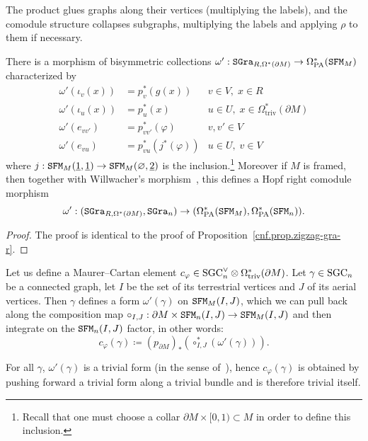 The product glues graphs along their vertices (multiplying the labels), and the comodule structure collapses subgraphs, multiplying the labels and applying $\rho$ to them if necessary.

\begin{proposition}
  \label{cnfbnd.prop.omega-prime-colored}
  There is a morphism of bisymmetric collections $\omega' : \mathtt{SGra}_{R, \Omega^{*}(\partial M)} \to \Omega_{\mathrm{PA}}^{*}(\mathtt{SFM}_{M})$ characterized by
  \begin{align*}
    \omega'(\iota_{v}(x))
    & = p_{v}^{*}(g(x))
    & v \in V, \; x \in R \\
    \omega'(\iota_{u}(x))
    & = p_{u}^{*}(x)
    & u \in U, \; x \in \Omega_{\mathrm{triv}}^{*}(\partial M) \\
    \omega'(e_{vv'})
    & = p_{vv'}^{*}(\varphi)
    & v, v' \in V \\
    \omega'(e_{vu})
    & = p_{vu}^{*}(j^{*}(\varphi))
    & u \in U, \; v \in V
  \end{align*}
  where $j : \mathtt{SFM}_{M}(\underline{1}, \underline{1}) \to \mathtt{SFM}_{M}(\varnothing,\underline{2})$ is the inclusion.\footnote{Recall that one must choose a collar $\partial M \times [0,1) \subset M$ in order to define this inclusion.}
  Moreover if $M$ is framed, then together with Willwacher's morphism~\cite{Willwacher2015a}, this defines a Hopf right comodule morphism
  \[ \omega' : (\mathtt{SGra}_{R, \Omega^{*}(\partial M)}, \mathtt{SGra}_{n}) \to (\Omega_{\mathrm{PA}}^{*}(\mathtt{SFM}_{M}), \Omega_{\mathrm{PA}}^{*}(\mathtt{SFM}_{n})). \]
\end{proposition}
\begin{proof}
  The proof is identical to the proof of Proposition~\ref{cnf.prop.zigzag-gra-r}.
\end{proof}

Let us define a Maurer--Cartan element $c_{\varphi} \in \mathrm{SGC}_{n}^{\vee} \otimes \Omega_{\mathrm{triv}}^{*}(\partial M)$.
Let $\gamma \in \mathrm{SGC}_{n}$ be a connected graph, let $I$ be the set of its terrestrial vertices and $J$ of its aerial vertices.
Then $\gamma$ defines a form $\omega'(\gamma)$ on $\mathtt{SFM}_{M}(I,J)$, which we can pull back along the composition map $\circ_{I,J} : \partial M \times \mathtt{SFM}_{n}(I,J) \to \mathtt{SFM}_{M}(I,J)$ and then integrate on the $\mathtt{SFM}_{n}(I,J)$ factor, in other words:
\begin{equation}
  c_{\varphi}(\gamma) \coloneqq (p_{\partial M})_{*}(\circ_{I,J}^{*}(\omega'(\gamma))).
\end{equation}

\begin{remark}
  For all $\gamma$, $\omega'(\gamma)$ is a trivial form (in the sense of~\cite[Appendix~C]{CamposWillwacher2016}), hence $c_{\varphi}(\gamma)$ is obtained by pushing forward a trivial form along a trivial bundle and is therefore trivial itself.
\end{remark}

